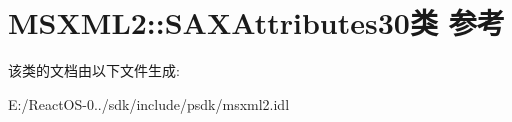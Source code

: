 \hypertarget{class_m_s_x_m_l2_1_1_s_a_x_attributes30}{}\section{M\+S\+X\+M\+L2\+:\+:S\+A\+X\+Attributes30类 参考}
\label{class_m_s_x_m_l2_1_1_s_a_x_attributes30}


该类的文档由以下文件生成\+:\begin{DoxyCompactItemize}
\item 
E\+:/\+React\+O\+S-\/0../sdk/include/psdk/msxml2.\+idl\end{DoxyCompactItemize}
